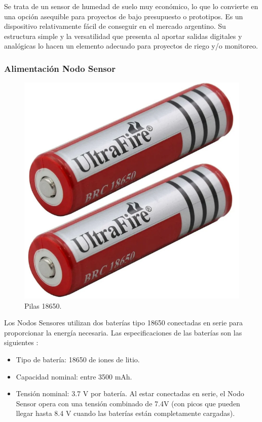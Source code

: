 Se trata de un sensor de humedad de suelo muy económico, lo que lo convierte en una opción asequible para proyectos de bajo presupuesto o prototipos.
Es un dispositivo relativamente fácil de conseguir en el mercado argentino.
Su estructura simple y la versatilidad que presenta al aportar salidas digitales y analógicas lo hacen un elemento adecuado para proyectos de riego y/o monitoreo.

\subsubsection{Alimentación Nodo Sensor}

\begin{figure}[H]
	\centering
	\includegraphics[scale=0.6]{./Figures/Hardware/Alimentacion/pilas.png}
	\caption{Pilas 18650.}
	\label{fig:pilas}
\end{figure}

\label{sec:AlimentacionNodoSensor}

Los Nodos Sensores utilizan dos baterías tipo 18650 conectadas en serie para proporcionar la energía necesaria. Las especificaciones de las baterías son las siguientes \cite{18650}:

\begin{itemize}
    \item Tipo de batería: 18650 de iones de litio.
    \item Capacidad nominal: entre  3500 mAh.
    \item Tensión nominal: 3.7 V por batería. Al estar conectadas en serie, el Nodo Sensor opera con una tensión combinado de 7.4V (con picos que pueden llegar hasta 8.4 V cuando las baterías están completamente cargadas).
\end{itemize}

